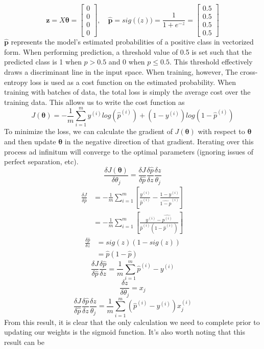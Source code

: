 \documentclass[11pt,largemargins]{homework}
\begin{document}
$$\mathbf{z}=X\mathbf{\theta}=
\begin{bmatrix}
	0\\
	0\\
	0\\
	0
\end{bmatrix},\quad\mathbf{\hat{p}}=sig(\mathbf(z))= \frac{1}{1+e^{-z}}=
\begin{bmatrix}
	0.5\\
	0.5\\
	0.5\\
	0.5
\end{bmatrix}$$
$\mathbf{\hat{p}}$ represents the model's estimated probabilities of a positive class in vectorized form. When performing prediction, a threshold value of 0.5 is set such that the predicted class is 1 when $p>0.5$ and 0 when $p\leq 0.5$. This threshold effectively draws a discriminant line in the input space. When training, however, The cross-entropy loss is used as a cost function on the estimated probability. When training with batches of data, the total loss is simply the average cost over the training data. This allows us to write the cost function as
$$J(\mathbf{\theta})=-\frac{1}{m}\sum_{i=1}^my^{(i)}log(\hat{p}^{(i)})+(1-y^{(i)})log(1-\hat{p}^{(i)})$$
To minimize the loss, we can calculate the gradient of $J(\mathbf{\theta})$ with respect to $\mathbf{\theta}$ and then update $\mathbf{\theta}$ in the negative direction of that gradient. Iterating over this process ad infinitum will converge to the optimal parameters (ignoring issues of perfect separation, etc).
$$\frac{\delta J(\mathbf{\theta})}{\delta \theta_j}=\frac{\delta J}{\delta \hat{p}}\frac{\delta \hat{p}}{\delta z}\frac{\delta z}{\theta_j}$$
\begin{align*}
	\frac{\delta J}{\delta\hat{p}} &= -\frac{1}{m}\sum_{i=1}^m\left[\frac{y^{(i)}}{\hat{p}^{(i)}}-\frac{1-y^{(i)}}{\hat{1-p}^{(i)}}\right]\\
	&= -\frac{1}{m}\sum_{i=1}^m\left[ \frac{y^{(i)}-\hat{p^{(i)}}}{\hat{p}^{(i)}(1-\hat{p}^{(i)})}\right]
\end{align*}
\begin{align*}
	\frac{\delta\hat{p}}{\delta z}&= sig(z)(1-sig(z))\\
	&= \hat{p}(1-\hat{p})
\end{align*}
$$\frac{\delta J}{\delta\hat{p}}\frac{\delta\hat{p}}{\delta z}=\frac{1}{m}\sum_{i=1}^m\hat{p}^{(i)}-y^{(i)}$$
$$\frac{\delta z}{\delta\theta_j}=x_j$$
$$\frac{\delta J}{\delta \hat{p}}\frac{\delta \hat{p}}{\delta z}\frac{\delta z}{\theta_j}=\frac{1}{m}\sum_{i=1}^m(\hat{p}^{(i)}-y^{(i)})x_j^{(i)}$$  
From this result, it is clear that the only calculation we need to complete prior to updating our weights is the sigmoid function.
It's also worth noting that this result can be 
\end{document}
